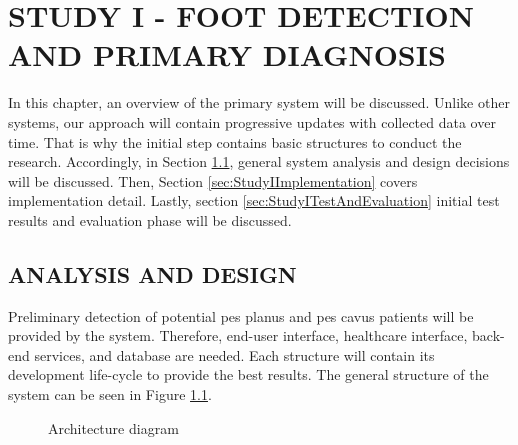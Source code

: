 \chapter{STUDY I - FOOT DETECTION AND PRIMARY DIAGNOSIS}\label{chp:Foot Detection & Primary Diagnosis}

In this chapter, an overview of the primary system will be discussed. Unlike other systems, our approach will contain progressive updates with collected data over time. That is why the initial step contains basic structures to conduct the research. Accordingly, in Section \ref{sec:StudyIAnalysisAndDesign}, general system analysis and design decisions will be discussed. Then, Section \ref{sec:StudyIImplementation} covers implementation detail. Lastly, section \ref{sec:StudyITestAndEvaluation} initial test results and evaluation phase will be discussed.

\section{ANALYSIS AND DESIGN}\label{sec:StudyIAnalysisAndDesign}

Preliminary detection of potential pes planus and pes cavus patients will be provided by the system. Therefore, end-user interface, healthcare interface, back-end services, and database are needed. Each structure will contain its development life-cycle to provide the best results. The general structure of the system can be seen in Figure \ref{fig:GeneralArchitectureDiagram}.

\begin{figure}[htbp]
\centering
{}
\caption{Architecture diagram}
\label{fig:GeneralArchitectureDiagram}
\end{figure}

